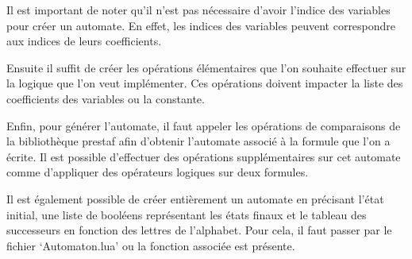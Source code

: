 Il est important de noter qu’il n’est pas nécessaire d’avoir l’indice des variables pour créer un automate. En effet, les indices des variables peuvent correspondre aux indices de leurs coefficients.\par

Ensuite il suffit de créer les opérations élémentaires que l’on souhaite effectuer sur la logique que l’on veut implémenter. Ces opérations doivent impacter la liste des coefficients des variables ou la constante.\par

Enfin, pour générer l’automate, il faut appeler les opérations de comparaisons de la bibliothèque prestaf afin d’obtenir l’automate associé à la formule que l’on a écrite. Il est possible d’effectuer des opérations supplémentaires sur cet automate comme d'appliquer des opérateurs logiques sur deux formules.\\\par

Il est également possible de créer entièrement un automate en précisant l’état initial, une liste de booléens représentant les états finaux et le tableau des successeurs en fonction des lettres de l’alphabet. Pour cela, il faut passer par le fichier ‘Automaton.lua’ ou la fonction associée est présente.
